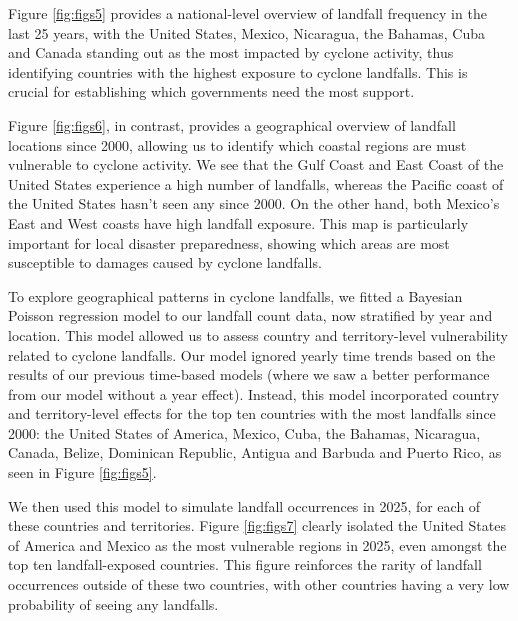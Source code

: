 \documentclass[
]{article}
\begin{document}
Figure \ref{fig:figs5} provides a national-level overview of landfall frequency in the last 25 years, with the United States, Mexico, Nicaragua, the Bahamas, Cuba and Canada standing out as the most impacted by cyclone activity, thus identifying countries with the highest exposure to cyclone landfalls. This is crucial for establishing which governments need the most support.

Figure \ref{fig:figs6}, in contrast, provides a geographical overview of landfall locations since 2000, allowing us to identify which coastal regions are must vulnerable to cyclone activity. We see that the Gulf Coast and East Coast of the United States experience a high number of landfalls, whereas the Pacific coast of the United States hasn't seen any since 2000. On the other hand, both Mexico's East and West coasts have high landfall exposure. This map is particularly important for local disaster preparedness, showing which areas are most susceptible to damages caused by cyclone landfalls.

To explore geographical patterns in cyclone landfalls, we fitted a Bayesian Poisson regression model to our landfall count data, now stratified by year and location. This model allowed us to assess country and territory-level vulnerability related to cyclone landfalls. Our model ignored yearly time trends based on the results of our previous time-based models (where we saw a better performance from our model without a year effect). Instead, this model incorporated country and territory-level effects for the top ten countries with the most landfalls since 2000: the United States of America, Mexico, Cuba, the Bahamas, Nicaragua, Canada, Belize, Dominican Republic, Antigua and Barbuda and Puerto Rico, as seen in Figure \ref{fig:figs5}.

We then used this model to simulate landfall occurrences in 2025, for each of these countries and territories. Figure \ref{fig:figs7} clearly isolated the United States of America and Mexico as the most vulnerable regions in 2025, even amongst the top ten landfall-exposed countries. This figure reinforces the rarity of landfall occurrences outside of these two countries, with other countries having a very low probability of seeing any landfalls.

\newpage
\end{document}
